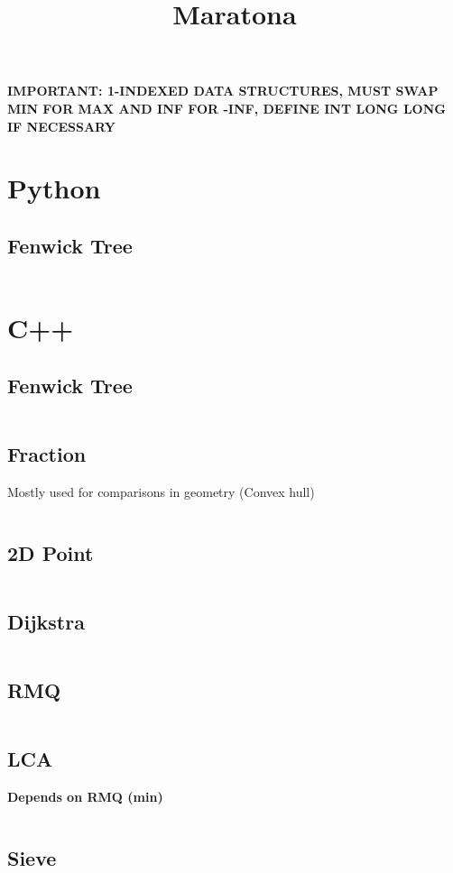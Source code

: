 \documentclass{article}
\title{Maratona}
\author{}
\date{}
\begin{document}
\maketitle

\textbf{IMPORTANT: 1-INDEXED DATA STRUCTURES, MUST SWAP MIN FOR MAX AND INF FOR -INF, DEFINE INT LONG LONG IF NECESSARY}

\tableofcontents
\newpage

\section{Python}
\subsection{Fenwick Tree}
\inputminted{python}{code/fenwick.py}

\section{C++}
\subsection{Fenwick Tree}
\inputminted[obeytabs=true,tabsize=4]{cpp}{code/fenwick.cpp}
\subsection{Fraction}
Mostly used for comparisons in geometry (Convex hull)
\inputminted[obeytabs=true,tabsize=4]{cpp}{code/fraction.cpp}
\subsection{2D Point}
\inputminted[obeytabs=true,tabsize=4]{cpp}{code/point.cpp}
\subsection{Dijkstra}
\inputminted[obeytabs=true,tabsize=4]{cpp}{code/dijkstra.cpp}
\subsection{RMQ}
\inputminted[obeytabs=true,tabsize=4]{cpp}{code/rmq.cpp}
\subsection{LCA}
\textbf{Depends on RMQ (min)}
\inputminted[obeytabs=true,tabsize=4]{cpp}{code/lca.cpp}
\subsection{Sieve}
\inputminted[obeytabs=true,tabsize=4]{cpp}{code/sieve.cpp}
\end{document}
